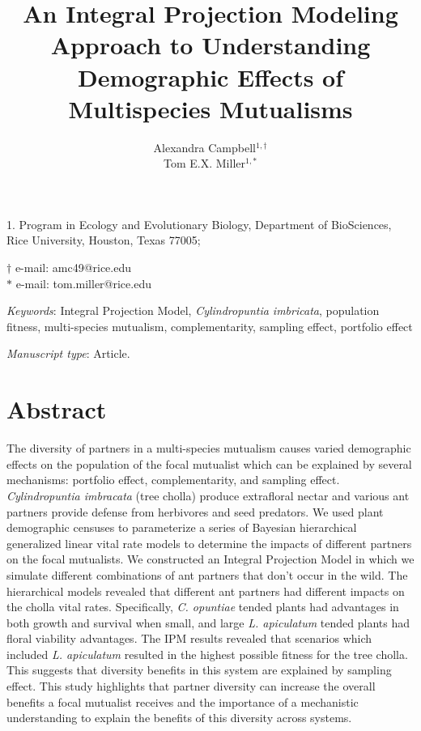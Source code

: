 \documentclass[11pt]{article}
\title{An Integral Projection Modeling Approach to Understanding Demographic Effects of Multispecies Mutualisms}
\author{Alexandra Campbell$^{1,\dagger}$ \\ 
	Tom E.X. Miller$^{1,\ast}$}
\date{}
\begin{document}
	
	\maketitle
	
	\noindent{} 1. Program in Ecology and Evolutionary Biology, Department of BioSciences, Rice University, Houston, Texas 77005;
	
	\noindent{} $\dagger$ e-mail: amc49@rice.edu\\
	\noindent{} $\ast$ e-mail: tom.miller@rice.edu
	
	\bigskip
	
	\textit{Keywords}:  Integral Projection Model, \textit{Cylindropuntia imbricata}, population fitness, multi-species mutualism, complementarity, sampling effect, portfolio effect
	
	\bigskip
	
	\textit{Manuscript type}: Article.
	
	\bigskip
	
	
	\linenumbers{}
	\modulolinenumbers[3]
	
	\newpage{}
	
	\section*{Abstract}
	The diversity of partners in a multi-species mutualism causes varied demographic effects on the population of the focal mutualist which can be explained by several mechanisms: portfolio effect, complementarity, and sampling effect.
	\textit{Cylindropuntia imbracata} (tree cholla) produce extrafloral nectar and various ant partners provide defense from herbivores and seed predators. 
	We used plant demographic censuses to parameterize a series of Bayesian hierarchical generalized linear vital rate models to determine the impacts of different partners on the focal mutualists. 
	We constructed an Integral Projection Model in which we simulate different combinations of ant partners that don’t occur in the wild.
	The hierarchical models revealed that different ant partners had different impacts on the cholla vital rates. 
	Specifically, \textit{C. opuntiae} tended plants had advantages in both growth and survival when small, and large \textit{L. apiculatum} tended plants had floral viability advantages. 
	The IPM results revealed that scenarios which included \textit{L. apiculatum} resulted in the highest possible fitness for the tree cholla. 
	This suggests that diversity benefits in this system are explained by sampling effect.
	This study highlights that partner diversity can increase the overall benefits a focal mutualist receives and the importance of a mechanistic understanding to explain the benefits of this diversity across systems.
	
\end{document}
